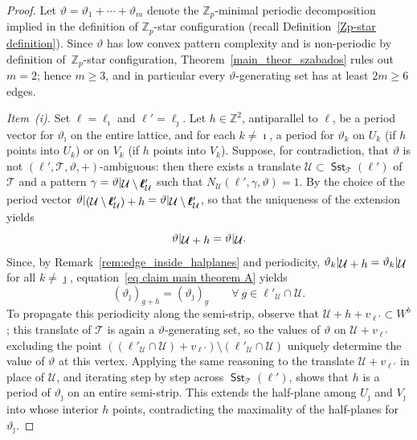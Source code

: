 \documentclass[12pt]{amsart}
\numberwithin{equation}{section}
\DeclareMathOperator{\sst}{\mathsf{Sst}}
\newcommand{\bb}[1]{\mathbb{#1}}
\newcommand{\sob}[1]{\ensuremath{{\mathbin |}\raise-.4ex\hbox{$#1$}}}
\begin{document}
\begin{proof}
Let $\vartheta = \vartheta_1+\cdots+\vartheta_m$ denote the $\bb{Z}_p$-minimal periodic decomposition implied in the definition of $\mathbb Z_p$-star configuration (recall Definition~\ref{Zp-star definition}). Since $\vartheta$ has low convex pattern complexity and is non-periodic by definition of~$\mathbb{Z}_p$-star configuration, Theorem~\ref{main_theor_szabados} rules out $m = 2$; hence $m \geq 3$, and in particular every $\vartheta$-generating set has at least $ 2m \geq 6$ edges.

\smallskip\noindent\textit{Item~(i).} 
Set $\pmb{\ell} = \pmb{\ell}_{\imath}$ and $\pmb{\ell}' = \pmb{\ell}_{\jmath}$. Let $h \in \bb{Z}^2$, antiparallel to $ \pmb{\ell} $, be a period vector for $\vartheta_{\imath}$ on the entire lattice, and for each $k \neq \imath$, a period for $ \vartheta_k $ on $  U_k $  (if $h$ points into $U_k$) or on $ V_k $ (if $h$ points into $V_k$). Suppose, for contradiction, that $ \vartheta $ is not $(\pmb{\ell}',\mathcal{T},\vartheta,+)$-ambiguous: then there exists a translate $ \mathcal U \subset \sst_{\mathcal T}(\pmb{\ell}') $ of $\mathcal T$ and a pattern $\gamma = \vartheta \sob{\mathcal U \setminus \pmb{\ell}'_{\mathcal U}}$ such that $ N_{\mathcal{U}}(\pmb{\ell}',\gamma,\vartheta) = 1$. By the choice of the period vector $ \vartheta \sob{(\mathcal U \setminus \pmb{\ell}'_{\mathcal U}) + h} = \vartheta \sob{\mathcal U \setminus \pmb{\ell}'_{\mathcal U}}$, so that the uniqueness of the extension yields
\begin{equation}\label{eq claim main theorem A}
	\vartheta\sob{\mathcal{U}+h} = \vartheta\sob{\mathcal{U}}.
\end{equation} 
Since, by Remark~\ref{rem:edge_inside_halplanes} and periodicity, $ \vartheta_k\sob{\mathcal{U}+h} = \vartheta_k\sob{\mathcal{U}} $ for all $ k \neq \jmath $, equation~\eqref{eq claim main theorem A} yields
$$ (\vartheta_{\jmath})_{g+h} = (\vartheta_{\jmath})_g \qquad \forall \ g \in \pmb{\ell}'_{\mathcal{U}} \cap \mathcal{U}.$$  
To propagate this periodicity along the semi-strip, observe that $ \mathcal U + h + v_{\pmb{\ell}'} \subset W^b $; 
this translate of $ \mathcal T $ is again a $\vartheta$-generating set, so the values of $ \vartheta $ on $ \mathcal U + v_{\pmb{\ell}'} $ excluding the point $ ((\pmb{\ell}'_{\mathcal U} \cap \mathcal{U}) + v_{\pmb{\ell}'}) \setminus (\pmb{\ell}'_{\mathcal U} \cap \mathcal{U}) $ uniquely determine the value of $ \vartheta $ at this vertex. Applying the same reasoning to the translate $\mathcal{U} + v_{\pmb{\ell}'}$ in place of $\mathcal U $, and iterating step by step across $\sst_{\mathcal T}(\pmb{\ell}')$, shows that $ h $ is a period of $\vartheta_{\jmath}$ on an entire semi-strip. This extends the half-plane among $U_{\jmath}$ and $V_{\jmath}$ into whose interior $ h $ points, contradicting the maximality of the half-planes for $\vartheta_{\jmath}$.
 

\end{proof}
\end{document}
